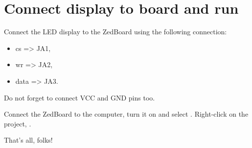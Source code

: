 \documentclass[openany,a4paper]{book}
\begin{document}
\section{Connect display to board and run}

Connect the LED display to the ZedBoard using the following connection:
\begin{itemize}
 \item cs => JA1,
 \item wr => JA2,
 \item data => JA3.
\end{itemize}

Do not forget to connect VCC and GND pins too.

Connect the ZedBoard to the computer, turn it on and select .
Right-click on the project, .

That's all, folks!
\end{document}
